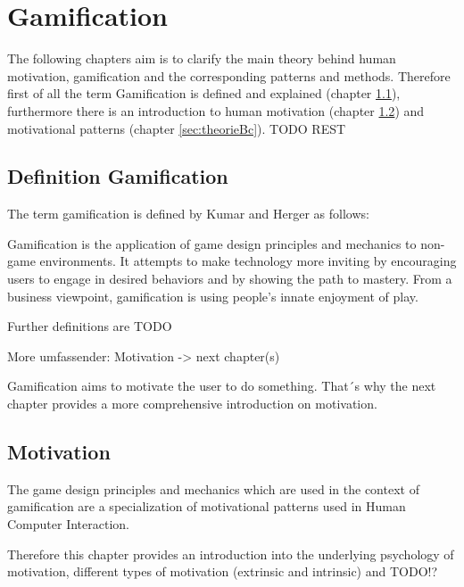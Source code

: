 \newpage
\section{Gamification}
\label{sec:theorieB}

The following chapters aim is to clarify the main theory behind human motivation, gamification and the corresponding patterns and methods. Therefore first of all the term Gamification is defined and explained (chapter \ref{sec:theorieBa}), furthermore there is an introduction to human motivation (chapter \ref{sec:theorieBb}) and motivational patterns (chapter \ref{sec:theorieBc}). TODO REST

\subsection{Definition Gamification}
\label{sec:theorieBa}

The term gamification is defined by Kumar and Herger as follows:

\begin{fquote}
	Gamification is the application of game design principles and mechanics to
	non-game environments. It attempts to make technology more inviting by encouraging users to engage in desired behaviors and by showing the path to mastery.
	From a business viewpoint, gamification is using people’s innate enjoyment of play.
\end{fquote}

Further definitions are TODO

\cite[p. 8]{inproceedings}

More umfassender: Motivation -> next chapter(s)

Gamification aims to motivate the user to do something. That´s why the next chapter provides a more comprehensive introduction on motivation.

\subsection{Motivation}
\label{sec:theorieBb}

The game design principles and mechanics which are used in the context of gamification are a specialization of motivational patterns used in Human Computer Interaction. \cite[p. 59]{inproceedings}

Therefore this chapter provides an introduction into the underlying psychology of motivation, different types of motivation (extrinsic and intrinsic) and TODO!?

